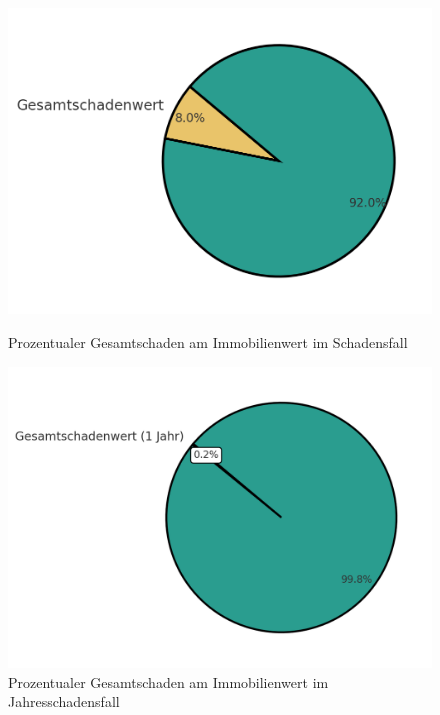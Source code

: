 \begin{figure}[H]
    \centering
    \begin{minipage}{0.45\textwidth}
        \centering
        \includegraphics[width=\textwidth]{figures/roundchartsloss.png}
        \caption{Prozentualer Gesamtschaden am Immobilienwert im Schadensfall}
        \label{fig:schadenereignis}
    \end{minipage}
    \hfill
    \begin{minipage}{0.45\textwidth}
        \centering
        \includegraphics[width=\textwidth]{figures/roundchartloss1year.png}
        \caption{Prozentualer Gesamtschaden am Immobilienwert im Jahresschadensfall}
        \label{fig:schadenereignis_jahr}
    \end{minipage}
\end{figure}


